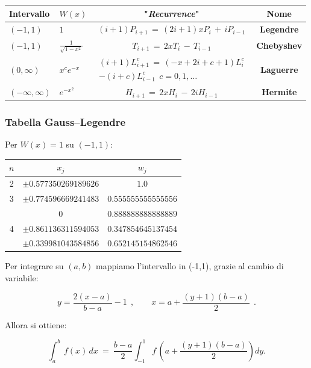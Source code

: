 \begin{center}
	\begin{tabular}{|l|l|c|c|}
		\hline
		Intervallo & $W(x)$ & "\emph{Recurrence}" & Nome \\
		\hline
		$(-1,1)$ & $1$ & $(i+1)P_{i+1}\,=\,(2i+1)xP_i\, +\, iP_{i-1}$ & \textbf{Legendre} \\
		$(-1,1)$ & $\displaystyle\frac{1}{\sqrt{1-x^2}}$ & $T_{i+1}\, =\, 2xT_i\,- \,T_{i-1}$ & \textbf{Chebyshev} \\
		$(0,\infty)$ & $x^c e^{-x}$ & $\begin{aligned} (i+1)L^c_{i+1}\,=\, (-x+2i+c+1) L^c_i \\ -(i+c)L^c_{i-1}\ \ c=0,1,\dots \end{aligned}$ &\textbf{Laguerre} \\
		$(-\infty,\infty)$ & $e^{-x^2}$ & $H_{i+1}\,=\, 2xH_i\,-\,2iH_{i-1}$ &\textbf{Hermite} \\
		\hline
	\end{tabular}
\end{center}

\subsubsection{Tabella Gauss–Legendre}

Per $W(x)=1$ su $(-1,1)$:

\begin{center}
	\begin{tabular}{|c|c|c|}
		\hline
		$n$ & $x_j$ & $w_j$ \\
		\hline
		2 & $\pm 0.577350269189626$ & $1.0$ \\
		\hline
		3 & $\pm 0.774596669241483$ & $0.555555555555556$ \\
		& $0$ & $0.888888888888889$ \\
		\hline
		4 & $\pm 0.861136311594053$ & $0.347854645137454$ \\
		& $\pm 0.339981043584856$ & $0.652145154862546$ \\
		\hline
	\end{tabular}
\end{center}

Per integrare su $(a,b)$ mappiamo l'intervallo in (-1,1), grazie al cambio di variabile:

\[
y = \frac{2(x-a)}{b-a} - 1 \ \ ,
\qquad
x = a + \frac{(y+1)(b-a)}{2}\ \ .
\]

Allora si ottiene:

\[
\int_a^b\, f(x)\,dx
\ =\
\frac{b-a}{2}
\int_{-1}^{1}
f\! \,\left(a + \frac{(y+1)(b-a)}{2}\right) dy.
\]

